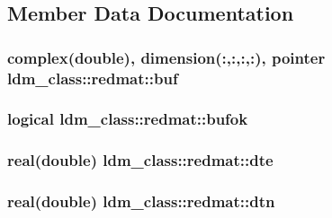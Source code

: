 \subsection{Member Data Documentation}
\hypertarget{structldm__class_1_1redmat_a0de897accb7698c28bc90f5c676b016a}{
\subsubsection[{buf}]{\setlength{\rightskip}{0pt plus 5cm}complex(double), dimension(\+:,\+:,\+:,\+:), pointer ldm\+\_\+class\+::redmat\+::buf\hspace{0.3cm}{\ttfamily [private]}}}\label{structldm__class_1_1redmat_a0de897accb7698c28bc90f5c676b016a}
\hypertarget{structldm__class_1_1redmat_ac8f3b2f71725d3d4cc6ae9a19d415513}{
\subsubsection[{bufok}]{\setlength{\rightskip}{0pt plus 5cm}logical ldm\+\_\+class\+::redmat\+::bufok\hspace{0.3cm}{\ttfamily [private]}}}\label{structldm__class_1_1redmat_ac8f3b2f71725d3d4cc6ae9a19d415513}
\hypertarget{structldm__class_1_1redmat_a28ce83b8f08247d607e2f88a5f811f01}{
\subsubsection[{dte}]{\setlength{\rightskip}{0pt plus 5cm}real(double) ldm\+\_\+class\+::redmat\+::dte\hspace{0.3cm}{\ttfamily [private]}}}\label{structldm__class_1_1redmat_a28ce83b8f08247d607e2f88a5f811f01}
\hypertarget{structldm__class_1_1redmat_ac63e64eb9cffeaca990fd76f1dc9c735}{
\subsubsection[{dtn}]{\setlength{\rightskip}{0pt plus 5cm}real(double) ldm\+\_\+class\+::redmat\+::dtn\hspace{0.3cm}{\ttfamily [private]}}}\label{structldm__class_1_1redmat_ac63e64eb9cffeaca990fd76f1dc9c735}
